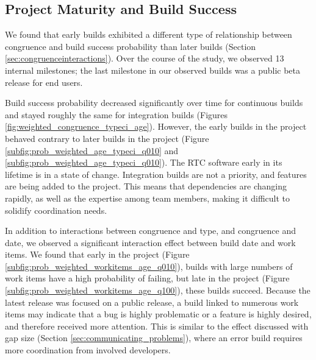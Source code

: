 \documentclass[12pt,oneside]{book}
\begin{document}


\subsection{Project Maturity and Build Success}

We found that early builds exhibited a different type of relationship between congruence and build success probability than later builds (Section \ref{sec:congruenceinteractions}). Over the course of the study, we observed 13 internal milestones; the last milestone in our observed builds was a public beta release for end users.

Build success probability decreased significantly over time for continuous builds and stayed roughly the same for integration builds (Figures \ref{fig:weighted_congruence_typeci_age}).
However, the early builds in the project behaved contrary to later builds in the project (Figure \ref{subfig:prob_weighted_age_typeci_q010} and \ref{subfig:prob_weighted_age_typeci_q010}). The RTC software early in its lifetime is in a state of change. Integration builds are not a priority, and features are being added to the project. This means that dependencies are changing rapidly, as well as the expertise among team members, making it difficult to solidify coordination needs.

In addition to interactions between congruence and type, and congruence and date, we observed a significant interaction effect between build date and work items.
We found that early in the project (Figure \ref{subfig:prob_weighted_workitems_age_q010}), builds with large numbers of work items have a high probability of failing, but late in the project (Figure \ref{subfig:prob_weighted_workitems_age_q100}), these builds succeed. Because the latest release was focused on a public release, a build linked to numerous work items may indicate that a bug is highly problematic or a feature is highly desired, and therefore received more attention. This is similar to the effect discussed with gap size (Section \ref{sec:communicating_problems}), where an error build requires more coordination from involved developers.



\end{document}
